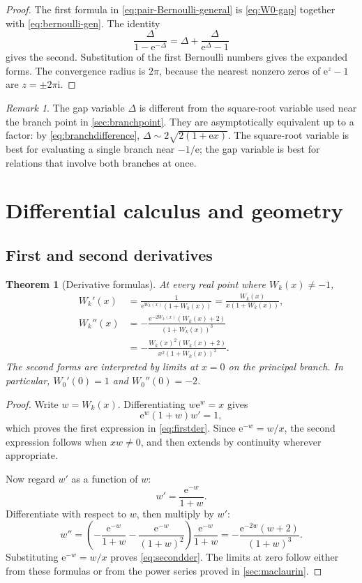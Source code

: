 \documentclass[11pt]{article}
\newtheorem{theorem}{Theorem}[section]
\theoremstyle{remark}
\newtheorem{remark}[remark]{Remark}
\newcommand{\Wz}{W_0}
\newcommand{\ee}{\mathrm e}
\newcommand{\ii}{\mathrm i}
\begin{document}
\begin{proof}
The first formula in \eqref{eq:pair-Bernoulli-general} is
\eqref{eq:W0-gap} together with \eqref{eq:bernoulli-gen}.  The identity
\[
       \frac{\Delta}{1-\ee^{-\Delta}}
       =\Delta+\frac{\Delta}{\ee^\Delta-1}
\]
gives the second.  Substitution of the first Bernoulli numbers gives the
expanded forms.  The convergence radius is \(2\pi\), because the nearest
nonzero zeros of \(\ee^z-1\) are \(z=\pm2\pi\ii\).
\end{proof}

\begin{remark}
The gap variable \(\Delta\) is different from the square-root variable used
near the branch point in \cref{sec:branchpoint}.  They are asymptotically
equivalent up to a factor: by \eqref{eq:branchdifference},
\(\Delta\sim2\sqrt{2(1+\ee x)}\).  The square-root variable is best for
evaluating a single branch near \(-1/\ee\); the gap variable is best for
relations that involve both branches at once.
\end{remark}

\section{Differential calculus and geometry}\label{sec:calculus}

\subsection{First and second derivatives}

\begin{theorem}[Derivative formulas]\label{thm:derivatives}
At every real point where \(W_k(x)\neq-1\),
\begin{align}
 W_k'(x)
   &=\frac{1}{\ee^{W_k(x)}(1+W_k(x))}
     =\frac{W_k(x)}{x(1+W_k(x))},\label{eq:firstder}\\
 W_k''(x)
   &=-\frac{\ee^{-2W_k(x)}(W_k(x)+2)}
              {(1+W_k(x))^3}\label{eq:secondder-exp}\\
   &=-\frac{W_k(x)^2(W_k(x)+2)}
              {x^2(1+W_k(x))^3}.\label{eq:secondder}
\end{align}
The second forms are interpreted by limits at \(x=0\) on the principal
branch.  In particular, \(\Wz'(0)=1\) and \(\Wz''(0)=-2\).
\end{theorem}

\begin{proof}
Write \(w=W_k(x)\).  Differentiating \(w\ee^w=x\) gives
\[
 \ee^w(1+w)w'=1,
\]
which proves the first expression in \eqref{eq:firstder}.  Since
\(\ee^{-w}=w/x\), the second expression follows when \(xw\neq0\), and then
extends by continuity wherever appropriate.

Now regard \(w'\) as a function of \(w\):
\[
       w'=\frac{\ee^{-w}}{1+w}.
\]
Differentiate with respect to \(w\), then multiply by \(w'\):
\[
 w''=\left(-\frac{\ee^{-w}}{1+w}
           -\frac{\ee^{-w}}{(1+w)^2}\right)
           \frac{\ee^{-w}}{1+w}
     =-\frac{\ee^{-2w}(w+2)}{(1+w)^3}.
\]
Substituting \(\ee^{-w}=w/x\) proves \eqref{eq:secondder}.
The limits at zero follow either from these formulas or from the power series
proved in \cref{sec:maclaurin}.
\end{proof}
\end{document}
